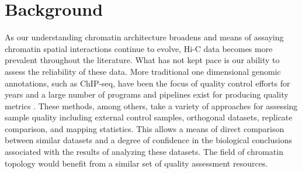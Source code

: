 \section{Background}

As our understanding chromatin architecture broadens and means of assaying chromatin spatial interactions continue to evolve, Hi-C data becomes more prevalent throughout the literature. What has not kept pace is our ability to assess the reliability of these data. More traditional one dimensional genomic annotations, such as ChIP-seq, have been the focus of quality control efforts for years and a large number of programs and pipelines exist for producing quality metrics \cite{landt_chip-seq_2012,planet_htseqtools:_2012,diaz_chance:_2012, carroll_impact_2014,marinov_large-scale_2014,qin_chilin:_2016}. These methods, among others, take a variety of approaches for assessing sample quality including external control samples, orthogonal datasets, replicate comparison, and mapping statistics. This allows a means of direct comparison between similar datasets and a degree of confidence in the biological conclusions associated with the results of analyzing these datasets. The field of chromatin topology would benefit from a similar set of quality assessment resources.
\\\\
